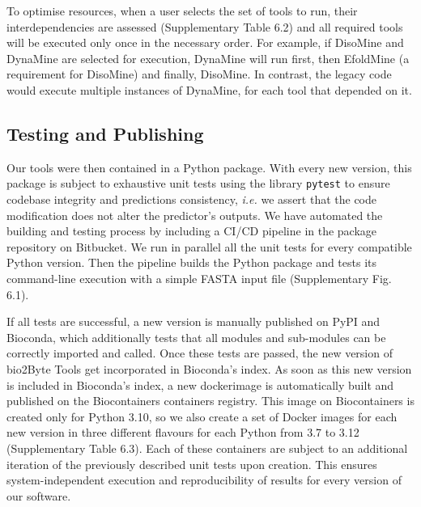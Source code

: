 To optimise resources, when a user selects the set of tools to run, their interdependencies are assessed (Supplementary Table 6.2)
and all required tools will be executed only once in the necessary order. For example, if DisoMine and DynaMine are selected for execution, DynaMine will run first, then EfoldMine (a requirement for DisoMine) and finally, DisoMine. In contrast, the legacy code would execute multiple instances of DynaMine, for each tool that depended on it. 


\subsection{Testing and Publishing}

Our tools were then contained in a Python package. With every new version, this package is subject to exhaustive unit tests using the library \lstinline|pytest| \cite{pytestx.y} to ensure codebase integrity and predictions consistency, \textit{i.e.} we assert that the code modification does not alter the predictor's outputs. 
We have automated the building and testing process by including a CI/CD pipeline in the package repository on Bitbucket. We run in parallel all the unit tests for every compatible Python version. Then the pipeline builds the Python package and tests its command-line execution with a simple FASTA input file (Supplementary Fig. 6.1).

If all tests are successful, a new version is manually published on PyPI and Bioconda, which additionally tests that all modules and sub-modules can be correctly imported and called. Once these tests are passed, the new version of bio2Byte Tools get incorporated in Bioconda's index. As soon as this new version is included in Bioconda's index, a new \gls{dockerimage} is automatically built and published on the Biocontainers containers registry. 
This image on Biocontainers is created only for Python 3.10, so we also create a set of Docker images for each new version in three different flavours for each Python from 3.7 to 3.12 (Supplementary Table 6.3).
Each of these containers are subject to an additional iteration of the previously described unit tests upon creation. This ensures system-independent execution and reproducibility of results for every version of our software.

